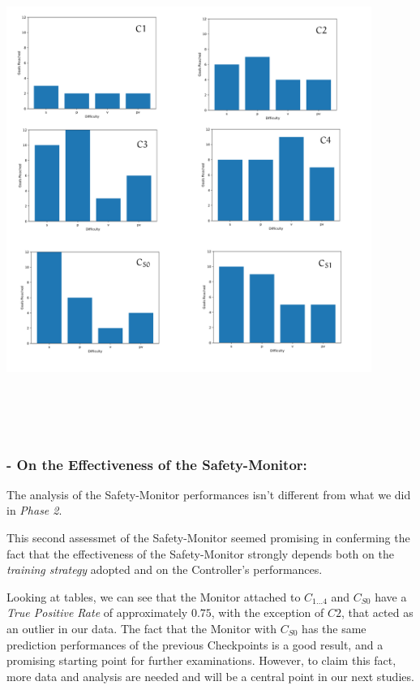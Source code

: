 \begin{minipage}[c]{450px}
	\includegraphics[width=450px,height=600px]{img/goals.png}
\end{minipage}


\subsubsection{- On the Effectiveness of the Safety-Monitor:}

The analysis of the Safety-Monitor performances isn't different from what we did in \textsl{Phase 2}.

This second assessmet of the Safety-Monitor seemed promising in conferming the fact that the effectiveness of the Safety-Monitor strongly depends both on the \textsl{training strategy} adopted and on the Controller's performances.

Looking at tables, we can see that the Monitor attached to $C_{1\dots 4}$ and $C_{S0}$ have a \textsl{True Positive Rate} of approximately $0.75$, with the exception of $C2$, that acted as an outlier in our data. The fact that the Monitor with $C_{S0}$ has the same prediction performances of the previous Checkpoints is a good result, and a promising starting point for further examinations. However, to claim this fact, more data and analysis are needed and will be a central point in our next studies.\newline

